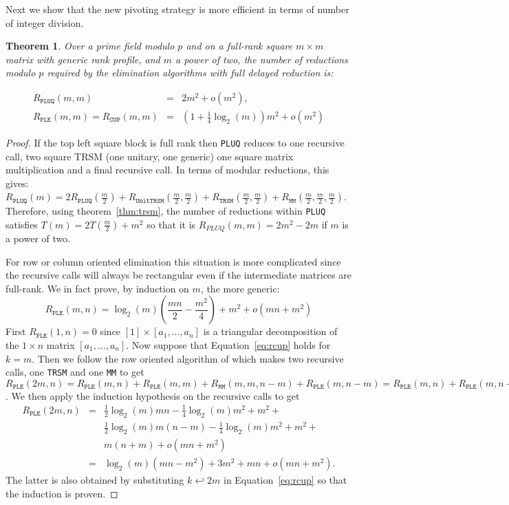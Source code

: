 \documentclass{article}
\newcommand{\customvspace}[1]{}
\newcommand{\pluq}{\texttt{PLUQ}\xspace}
\newcommand{\ple}{\texttt{PLE}\xspace}
\newcommand{\cupd}{\texttt{CUP}\xspace}
\newcommand{\trsm}{\texttt{TRSM}\xspace}
\newcommand{\MM}{\texttt{MM}\xspace}
\newcommand{\po}[1]{\ensuremath{o\left(#1\right)}\xspace}
\newtheorem{theorem}{Theorem}
\begin{document}
Next we show that the new pivoting strategy is more efficient in terms
of number of integer division. 
\begin{theorem} Over a prime field modulo $p$ and on a full-rank
  square $m\times m$ matrix with generic rank profile, and $m$ a power
  of two, the number of reductions modulo $p$ required by the
 elimination algorithms with full delayed reduction is:
\customvspace{-5pt}
$$  \begin{array}{lcl}
  R_{\pluq}(m,m) &=&2m^2+\po{m^2},\\
  R_{\ple}(m,m)=R_{\cupd}(m,m) &=&\left(1+\frac{1}{4}\log_2(m)\right)m^2+\po{m^2}
  \end{array}
$$
\customvspace{-10pt}
\end{theorem}
\begin{proof}
If the top left square block is full rank then \pluq reduces to
  one recursive call, two square TRSM (one unitary, one generic) one
  square matrix multiplication and a final recursive call. In terms of modular reductions, this gives: 
$R_{\pluq}(m)=2R_{\pluq}(\frac{m}{2})+R_{\texttt{UnitTRSM}}(\frac{m}{2},\frac{m}{2})+R_{\trsm}(\frac{m}{2},\frac{m}{2})+R_{\MM}(\frac{m}{2},\frac{m}{2},\frac{m}{2})$.
Therefore, using theorem~\ref{thm:trsm}, the number of reductions
within \pluq satisfies $T(m)=2T(\frac{m}{2})+m^2$ so that
it is $R_{PLUQ}(m,m) =2m^2-2m$ if $m$ is a power of two.

For row or column oriented elimination this situation is more
  complicated since the recursive calls will always be
  rectangular even if the intermediate matrices are full-rank.
We in fact prove, by induction on $m$, the more generic:
\begin{equation}\label{eq:rcup}
R_{\ple}(m,n)=\log_2(m)(\frac{mn}{2}-\frac{m^2}{4})
            +m^2+\po{mn+m^2}
\end{equation}
First $R_{\ple}(1,n)=0$ since $[1]\times[a_1,\ldots,a_n]$ is a triangular decomposition of the $1\times n$ matrix $[a_1,\ldots,a_n]$.
Now suppose that Equation~\ref{eq:rcup} holds for $k = m$.
Then we follow the row oriented algorithm of \cite[Lemma 5.1]{jgd:2008:toms} which makes two recursive calls, one \trsm and one \MM to get  $R_{\ple}(2m,n)=R_{\ple}(m,n)+R_{\ple}(m,m)+R_{\MM}(m,m,n-m)+R_{\ple}(m,n-m)=R_{\ple}(m,n)+R_{\ple}(m,n-m)+m(n+m)$. 
We then apply the induction hypothesis on the recursive calls to get
\begin{eqnarray*}
R_{\ple}(2m,n)&=&\frac{1}{2}\log_2(m)mn-\frac{1}{4}\log_2(m)m^2+m^2+\\
&&\frac{1}{2}\log_2(m)m(n-m)-\frac{1}{4}\log_2(m)m^2+m^2+\\
&&m(n+m)+\po{mn+m^2}\\
& =& \log_2(m)(mn-m^2)+3m^2+mn+\po{mn+m^2}.
\end{eqnarray*}
The latter is also obtained by substituting $k\hookleftarrow 2m$ in Equation~\ref{eq:rcup} so that the induction is proven.
\customvspace{-15pt}\end{proof}
\end{document}
